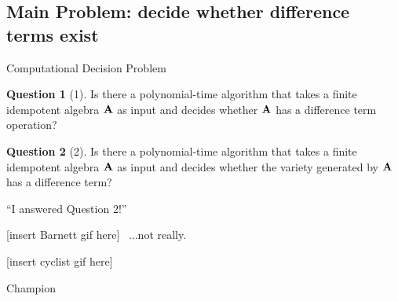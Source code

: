 \documentclass[notes=hide,12pt,xcolor=dvipsnames%
   ]{beamer}
\theoremstyle{definition}
\newtheorem{question}{Question}
\begin{document}
\subsection{Main Problem: decide whether difference terms exist}

\begin{frame}[label=computational]{Computational Decision Problem}

  \begin{question}[1]
    \label{prob:2}
    Is there a polynomial-time algorithm that takes a finite
    idempotent algebra $\mathbf{A}$ as input and decides whether 
    $\mathbf{A}$ has a difference term operation?
  \end{question}

  \pause
  \begin{question}[2]
  \label{prob:1}
  Is there a polynomial-time algorithm that takes a finite
  idempotent algebra $\mathbf{A}$ as input and decides whether the variety generated by
  $\mathbf{A}$ has a difference term?
  \end{question}

\end{frame}

\begin{frame}[label=premature]{}

  \begin{center}
    ``I answered Question 2!''


    [insert Barnett gif here]
    \pause
    ~\phantom{XXXXXXXXXXX}...not really.
  \end{center}
\end{frame}

\begin{frame}[label=premature2]{}
  \begin{center}
    [insert cyclist gif here]
    \pause
  \end{center}
\end{frame}

  \begin{frame}[label=champion]{Champion}
\end{frame}


\end{document}
